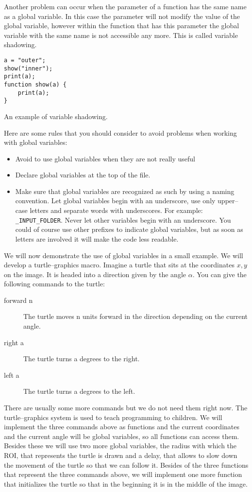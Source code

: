 Another problem can occur when the parameter of a function has the same name as a global variable. In this case the parameter will not modify the value of the global variable, however within the function that has this parameter the global variable with the same name is not accessible any more. This is called variable shadowing.

\begin{listing}[H]
\begin{verbatim}
a = "outer";
show("inner");
print(a);
function show(a) {
	print(a);
}
\end{verbatim}
\caption{An example of variable shadowing.}
\label{lst:variable_shadowing} 
\end{listing}

Here are some rules that you should consider to avoid problems when working with global variables:
\begin{itemize}
\item Avoid to use global variables when they are not really useful
\item Declare global variables at the top of the file.
\item Make sure that global variables are recognized as such by using a naming convention. Let global variables begin with an underscore, use only upper--case letters and  separate words with underscores. For example: {\tt \_INPUT\_FOLDER}. Never let other variables begin with an underscore. You could of course use other prefixes to indicate global variables, but as soon as letters are involved it will make the code less readable.
\end{itemize}

We will now demonstrate the use of global variables in a small example. We will develop a turtle--graphics \cite{papert_mindstorms:_1993} macro. Imagine a turtle that sits at the coordinates $x, y$ on the image. It is headed into a direction given by the angle $\alpha$. You can give the following commands to the turtle:
\begin{description}
\item[{forward n}] The turtle moves n units forward in the direction depending on the current angle.
\item[{right a}] The turtle turns a degrees to the right.
\item[{left a}] The turtle turns a degrees to the left.
\end{description}

There are usually some more commands but we do not need them right now. The turtle--graphics system is used to teach programming to children. We will implement the three commands above as functions and the current coordinates and the current angle will be global variables, so all functions can access them. Besides these we will use two more global variables, the radius with which the ROI, that represents the turtle is drawn and a delay, that allows to slow down the movement of the turtle so that we can follow it. Besides of the three functions that represent the three commands above, we will implement one more function that initializes the turtle so that in the beginning it is in the middle of the image.

